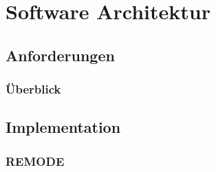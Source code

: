 
\chapter{Software Architektur}
\section{Anforderungen}
\label{sec:Anforderungen} 



\subsection{Überblick}
\label{Überblick}

\section{Implementation}
\label{Implementation}

\newpage
\subsection{REMODE}




